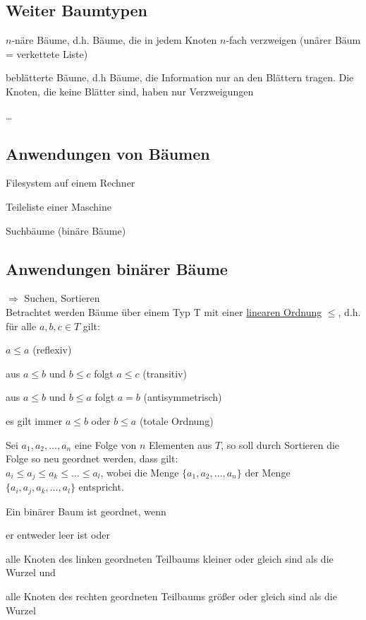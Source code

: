 \subsection{Weiter Baumtypen}
\begin{compactitem}
	\item $n$-näre Bäume, d.h. Bäume, die in jedem Knoten $n$-fach verzweigen (unärer Bäum = verkettete Liste)
	\item beblätterte Bäume, d.h Bäume, die Information nur an den Blättern tragen. Die Knoten, die keine Blätter sind, haben nur Verzweigungen
	\item \ldots
\end{compactitem}

\subsection{Anwendungen von Bäumen}
\begin{compactitem}
	\item Filesystem auf einem Rechner
	\item Teileliste einer Maschine
	\item Suchbäume (binäre Bäume)
\end{compactitem}

\subsection{Anwendungen binärer Bäume}
$\Rightarrow$ Suchen, Sortieren\\
Betrachtet werden Bäume über einem Typ T mit einer \ul{linearen Ordnung} $\le$, d.h. für alle $a, b, c \in T$ gilt:
\begin{compactitem}
	\item $a \le a$ (reflexiv)
	\item aus $a \le b$ und $b \le c$ folgt $a \le c$ (transitiv)
	\item aus $a \le b$ und $b \le a$ folgt $a = b$ (antisymmetrisch)
	\item es gilt immer $a \le b$ oder $b \le a$ (totale Ordnung)
\end{compactitem}

Sei $a_1, a_2, \ldots, a_n$ eine Folge von $n$ Elementen aus $T$, so soll durch Sortieren die Folge so neu geordnet werden, dass gilt:\\
$a_i \le a_j \le a_k \le \ldots \le a_l$, wobei die Menge $\{a_1, a_2, \ldots, a_n\}$ der Menge $\{a_i, a_j, a_k, \ldots, a_l\}$ entspricht.

Ein binärer Baum ist geordnet, wenn
\begin{compactitem}
	\item er entweder leer ist oder
	\item alle Knoten des linken geordneten Teilbaums kleiner oder gleich sind als die Wurzel und
	\item alle Knoten des rechten geordneten Teilbaums größer oder gleich sind als die Wurzel
\end{compactitem}


